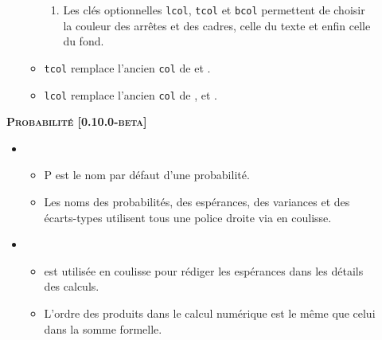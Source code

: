 \documentclass[12pt,a4paper]{book}
\begin{document}
\begin{description}
\begin{itemize}[itemsep=.5em]
\begin{itemize}[itemsep=.5em]
\begin{enumerate}
        	\item Les clés optionnelles \verb#lcol#, \verb#tcol# et \verb#bcol# permettent de choisir la couleur des arrêtes et des cadres, celle du texte et enfin celle du fond.
        \end{enumerate}


        \item \verb#tcol# remplace l'ancien \verb#col# de  et .

		\item \verb#lcol# remplace l'ancien \verb#col# de ,  et .



    \end{itemize}
\end{itemize}


\begin{center}
    \textbf{\textsc{Probabilité [0.10.0-beta]}}
\end{center}

\begin{itemize}[itemsep=.5em]
    \item {}

    \begin{itemize}[itemsep=.5em]
        \item $\mathrm{P}$ est le nom par défaut d'une probabilité.

		\item Les noms des probabilités, des espérances, des variances et des écarts-types utilisent tous une police droite via  en coulisse.
    \end{itemize}




    \item {}

    \begin{itemize}[itemsep=.5em]
        \item {} est utilisée en coulisse pour rédiger les espérances dans les détails des calculs.
        
		\item L'ordre des produits dans le calcul numérique est le même que celui dans la somme formelle.
    \end{itemize}
\end{itemize}


\separation


\end{description}
\end{document}
